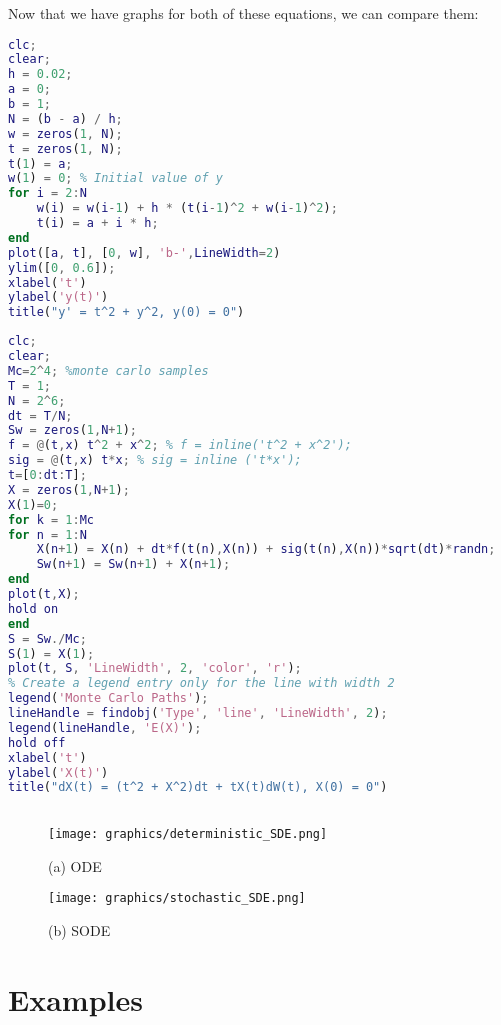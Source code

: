 \documentclass[twoside,final]{hcmut-report}
\begin{document}
Now that we have graphs for both of these equations, we can compare them:
\begin{lstlisting}[language=Matlab, caption={My MATLAB Code}, label={lst:matlabcode}]
clc;
clear;
h = 0.02;
a = 0;
b = 1;
N = (b - a) / h;
w = zeros(1, N);
t = zeros(1, N);
t(1) = a;
w(1) = 0; % Initial value of y
for i = 2:N
    w(i) = w(i-1) + h * (t(i-1)^2 + w(i-1)^2);
    t(i) = a + i * h;
end
plot([a, t], [0, w], 'b-',LineWidth=2)
ylim([0, 0.6]);
xlabel('t')
ylabel('y(t)')
title("y' = t^2 + y^2, y(0) = 0")

\end{lstlisting}
\newpage
\begin{lstlisting}[language=Matlab, caption={My MATLAB Code}, label={lst:matlabcode}]
clc;
clear;
Mc=2^4; %monte carlo samples
T = 1;
N = 2^6;
dt = T/N;
Sw = zeros(1,N+1);
f = @(t,x) t^2 + x^2; % f = inline('t^2 + x^2');
sig = @(t,x) t*x; % sig = inline ('t*x');
t=[0:dt:T];
X = zeros(1,N+1);
X(1)=0;
for k = 1:Mc
for n = 1:N
    X(n+1) = X(n) + dt*f(t(n),X(n)) + sig(t(n),X(n))*sqrt(dt)*randn;    
    Sw(n+1) = Sw(n+1) + X(n+1);   
end
plot(t,X);
hold on
end
S = Sw./Mc;
S(1) = X(1);
plot(t, S, 'LineWidth', 2, 'color', 'r');
% Create a legend entry only for the line with width 2
legend('Monte Carlo Paths');
lineHandle = findobj('Type', 'line', 'LineWidth', 2);
legend(lineHandle, 'E(X)');
hold off
xlabel('t')
ylabel('X(t)')
title("dX(t) = (t^2 + X^2)dt + tX(t)dW(t), X(0) = 0")



\end{lstlisting}
\newpage
 \begin{figure}[h]
      \centering
                    \texttt{[image: graphics/deterministic\_SDE.png]}
                    \caption{(a) ODE}
    \end{figure}
    \newpage
     \begin{figure}[h]
      \centering
                    \texttt{[image: graphics/stochastic\_SDE.png]}
                    \caption{(b) SODE}
    \end{figure}




\newpage
\section{Examples}
\end{document}
